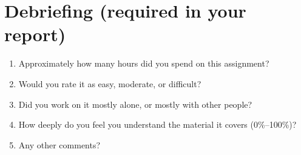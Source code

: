\documentclass[11pt]{article}
\begin{document}


%
%
%
%
%
%
%





{%
\section*{Debriefing (required in your report)}
\begin{enumerate}
\item Approximately how many hours did you spend on this assignment?
\item Would you rate it as easy, moderate, or difficult?
\item Did you work on it mostly alone, or mostly with other people?
\item How deeply do you feel you understand the material it covers (0\%--100\%)?
\item Any other comments?
\end{enumerate}
}
\end{document}
